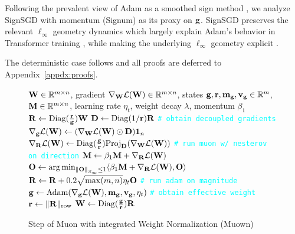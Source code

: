\documentclass{article}
\newcommand{\algname}{Muown}
\begin{document}
Following the prevalent view of Adam as a smoothed sign method \citep{kunstner2023noise}, we analyze SignSGD with momentum (Signum) as its proxy on $\mathbf{g}$. SignSGD preserves the relevant $\ell_\infty$ geometry dynamics which largely explain Adam's behavior in Transformer training \citep{kunstner2023noise}, while making the underlying $\ell_\infty$ geometry explicit \citep{bernstein_signsgd_2018,balles_geometry_2020,xie_implicit_2024}.

The deterministic case follows and all proofs are deferred to Appendix~\ref{appdx:proofs}.

\begin{figure}
  \vspace{-20pt}
  \begin{minipage}{0.51\textwidth}
    \begin{algorithm}[H]
    \caption{Step of Muon with integrated Weight Normalization (\algname{})}\label{alg:algname}
    {\linespread{1.3}\selectfont
    \begin{algorithmic}
    \Require $\mathbf{W} \in \mathbb{R}^{m \times n}$, gradient $\nabla_{\mathbf{W}} \mathcal{L}(\mathbf{W}) \in \mathbb{R}^{m \times n}$,
    states $\mathbf{g}, \mathbf{r}, \mathbf{m}_{\mathbf{g}}, \mathbf{v}_{\mathbf{g}} \in \mathbb{R}^{m}$, $\mathbf{M} \in \mathbb{R}^{m \times n}$, learning rate $\eta_t$, weight decay $\lambda$, momentum $\beta_1$
    \State $\mathbf{R} \gets \mathrm{Diag}(\frac{\mathbf{r}}{\mathbf{g}}) \mathbf{W}$
    \State $\mathbf{D} \gets \mathrm{Diag}(1/\mathbf{r})\mathbf{R}$
    \State \textcolor{cyan}{\texttt{\# obtain decoupled gradients}}
    \State $\nabla_{\mathbf{g}} \mathcal{L}(\mathbf{W}) \gets (\nabla_{\mathbf{W}} \mathcal{L}(\mathbf{W}) \odot\mathbf{D}) \mathbf{1}_n$
    \State $\nabla_{\mathbf{R}} \mathcal{L}(\mathbf{W}) \gets \mathrm{Diag}(\frac{\mathbf{g}}{\mathbf{r}})\mathrm{Proj}_{\mathbf{D}}(\nabla_{\mathbf{W}}\mathcal{L}(\mathbf{W}))$
    \State \textcolor{cyan}{\texttt{\# run muon w/ nesterov on direction}}
    \State $\mathbf{M} \gets \beta_1 \mathbf{M} + \nabla_{\mathbf{R}} \mathcal{L}(\mathbf{W})$
    \State $\mathbf{O} \gets \arg\min_{\left \| \mathbf{O} \right\|_{S_\infty} \le 1}\langle \beta_1\mathbf{M} + \nabla_{\mathbf{R}} \mathcal{L}(\mathbf{W}),\mathbf{O}\rangle$
    \State $\mathbf{R} \gets \mathbf{R} + 0.2 \sqrt{\max(m, n)}\eta_t \mathbf{O}$
    \State \textcolor{cyan}{\texttt{\# run adam on magnitude}}
    \State $\mathbf{g}  \gets \mathrm{Adam}(\nabla_{\mathbf{g}} \mathcal{L}(\mathbf{W}), \mathbf{m}_{\mathbf{g}}, \mathbf{v}_{\mathbf{g}}, \eta_t)$
    \State \textcolor{cyan}{\texttt{\# obtain effective weight}}
    \State $\mathbf{r} \gets \|\mathbf{R}\|_{\mathrm{row}}$
    \State $\mathbf{W} \gets \mathrm{Diag}(\frac{\mathbf{g}}{\mathbf{r}}) \mathbf{R}$
    \end{algorithmic}
    }
\end{algorithm}
  \end{minipage}
  \vspace{-30pt} %
\end{figure}
\end{document}
